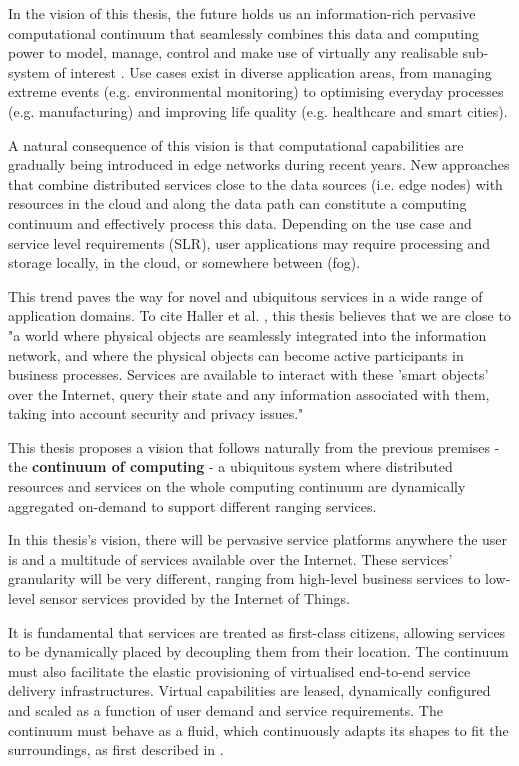 \documentclass{ieeeaccess}
\begin{document}
In the vision of this thesis, the future holds us an information-rich pervasive computational continuum that seamlessly combines this data and computing power to model, manage, control and make use of virtually any realisable sub-system of interest \cite{computing-in-continuum}. Use cases exist in diverse application areas, from managing extreme events (e.g. environmental monitoring) to optimising everyday processes (e.g. manufacturing) and improving life quality (e.g. healthcare and smart cities).

A natural consequence of this vision is that computational capabilities are gradually being introduced in edge networks during recent years. New approaches that combine distributed services close to the data sources (i.e. edge nodes) with resources in the cloud and along the data path can constitute a computing continuum and effectively process this data. Depending on the use case and service level requirements (SLR), user applications may require processing and storage locally, in the cloud, or somewhere between (fog).

This trend paves the way for novel and ubiquitous services in a wide range of application domains. To cite Haller et al. \cite{iot-enterprise}, this thesis believes that we are close to "a world where physical objects are seamlessly integrated into the information network, and where the physical objects can become active participants in business processes. Services are available to interact with these 'smart objects' over the Internet, query their state and any information associated with them, taking into account security and privacy issues."

This thesis proposes a vision that follows naturally from the previous premises - the \textbf{continuum of computing} - a  ubiquitous system where distributed resources and services on the whole computing continuum are dynamically aggregated on-demand to support different ranging services.

In this thesis's vision, there will be pervasive service platforms anywhere the user is and a multitude of services available over the Internet. These services' granularity will be very different, ranging from high-level business services to low-level sensor services provided by the Internet of Things.

It is fundamental that services are treated as first-class citizens, allowing services to be dynamically placed by decoupling them from their location. The continuum must also facilitate the elastic provisioning of virtualised end-to-end service delivery infrastructures. Virtual capabilities are leased, dynamically configured and scaled as a function of user demand and service requirements. The continuum must behave as a fluid, which continuously adapts its shapes to fit the surroundings, as first described in \cite{fluid-internet}.
\end{document}
